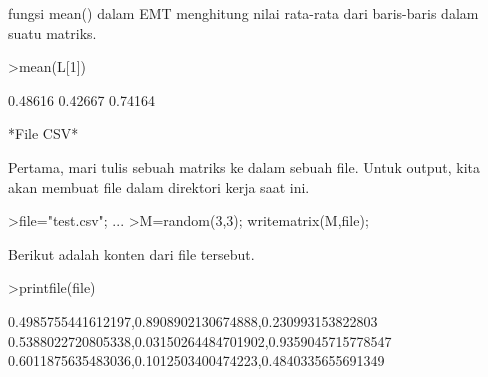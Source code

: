 \documentclass[12pt,arial,letterpaper]{book}
\begin{document}
\begin{eulercomment}
\begin{eulercomment}
\begin{eulercomment}
\begin{eulercomment}
\begin{eulercomment}
\begin{eulercomment}
\begin{eulercomment}
\begin{eulercomment}
\begin{eulercomment}
\begin{eulercomment}
\begin{eulercomment}
\begin{eulercomment}
\begin{eulercomment}
\begin{eulercomment}
\begin{eulercomment}
\begin{eulercomment}
\begin{eulercomment}
\begin{eulercomment}
\begin{eulercomment}
\begin{eulercomment}
\begin{eulercomment}
\begin{eulercomment}
\begin{eulercomment}
\begin{eulercomment}
\begin{eulercomment}
\begin{eulercomment}
\begin{eulercomment}
\begin{eulercomment}
\begin{eulercomment}
\begin{eulercomment}
\begin{eulercomment}
\begin{eulercomment}
\begin{eulercomment}
\begin{eulercomment}
\begin{eulercomment}
\begin{eulercomment}
\begin{eulercomment}
\begin{eulercomment}
\begin{eulercomment}
fungsi mean() dalam EMT menghitung nilai rata-rata dari baris-baris
dalam suatu matriks.
\end{eulercomment}
\begin{eulerprompt}
>mean(L[1])
\end{eulerprompt}
\begin{euleroutput}
    0.48616 
    0.42667 
    0.74164 
\end{euleroutput}
\begin{eulercomment}
*File CSV*

Pertama, mari tulis sebuah matriks ke dalam sebuah file. Untuk output,
kita akan membuat file dalam direktori kerja saat ini.
\end{eulercomment}
\begin{eulerprompt}
>file="test.csv";  ...
>M=random(3,3); writematrix(M,file);
\end{eulerprompt}
\begin{eulercomment}
Berikut adalah konten dari file tersebut.
\end{eulercomment}
\begin{eulerprompt}
>printfile(file)
\end{eulerprompt}
\begin{euleroutput}
  0.4985755441612197,0.8908902130674888,0.230993153822803
  0.5388022720805338,0.03150264484701902,0.9359045715778547
  0.6011875635483036,0.1012503400474223,0.4840335655691349
  

\end{euleroutput}
\end{eulercomment}
\end{eulercomment}
\end{eulercomment}
\end{eulercomment}
\end{eulercomment}
\end{eulercomment}
\end{eulercomment}
\end{eulercomment}
\end{eulercomment}
\end{eulercomment}
\end{eulercomment}
\end{eulercomment}
\end{eulercomment}
\end{eulercomment}
\end{eulercomment}
\end{eulercomment}
\end{eulercomment}
\end{eulercomment}
\end{eulercomment}
\end{eulercomment}
\end{eulercomment}
\end{eulercomment}
\end{eulercomment}
\end{eulercomment}
\end{eulercomment}
\end{eulercomment}
\end{eulercomment}
\end{eulercomment}
\end{eulercomment}
\end{eulercomment}
\end{eulercomment}
\end{eulercomment}
\end{eulercomment}
\end{eulercomment}
\end{eulercomment}
\end{eulercomment}
\end{eulercomment}
\end{eulercomment}
\end{document}
